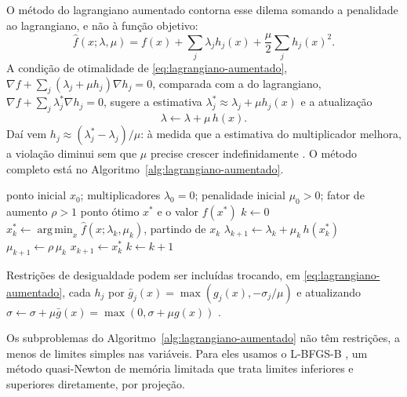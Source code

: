 \documentclass[12pt, oneside, a4paper, english, brazil]{abntex2}
\theoremstyle{relatorio}
\theoremstyle{relatorioit}
\theoremstyle{problema}
\DeclareMathOperator*{\argmin}{arg\,min}
\begin{document}
O método do lagrangiano aumentado \parencite{hestenes1969, powell1969} contorna esse
dilema somando a penalidade ao lagrangiano, e não à função objetivo:
\begin{equation}
  \hat f(x; \lambda, \mu) = f(x) + \sum_j \lambda_j h_j(x) + \frac{\mu}{2} \sum_j h_j(x)^2.
  \label{eq:lagrangiano-aumentado}
\end{equation}
A condição de otimalidade de \eqref{eq:lagrangiano-aumentado},
$\nabla f + \sum_j (\lambda_j + \mu h_j) \nabla h_j = 0$, comparada com a do lagrangiano,
$\nabla f + \sum_j \lambda^*_j \nabla h_j = 0$, sugere a estimativa
$\lambda_j^* \approx \lambda_j + \mu h_j(x)$ e a atualização
\begin{equation}
  \lambda \leftarrow \lambda + \mu\, h(x).
  \label{eq:atualizacao}
\end{equation}
Daí vem $h_j \approx (\lambda_j^* - \lambda_j)/\mu$: à medida que a estimativa do
multiplicador melhora, a violação diminui sem que $\mu$ precise crescer
indefinidamente \parencite{martins2021}. O método completo está no
Algoritmo~\ref{alg:lagrangiano-aumentado}.

\begin{algorithm}[H]
\caption{Método do lagrangiano aumentado \parencite[Alg.~5.2]{martins2021}}
\label{alg:lagrangiano-aumentado}
\begin{algorithmic}[1]
  \Require ponto inicial $x_0$; multiplicadores $\lambda_0 = 0$; penalidade inicial
    $\mu_0 > 0$; fator de aumento $\rho > 1$
  \Ensure ponto ótimo $x^*$ e o valor $f(x^*)$
  \State $k \gets 0$
    \State $x_k^* \gets \argmin_x \hat f(x; \lambda_k, \mu_k)$, partindo de $x_k$
    \State $\lambda_{k+1} \gets \lambda_k + \mu_k\, h(x_k^*)$ 
    \State $\mu_{k+1} \gets \rho\, \mu_k$ 
    \State $x_{k+1} \gets x_k^*$ 
    \State $k \gets k + 1$
  \EndWhile
\end{algorithmic}
\end{algorithm}

Restrições de desigualdade podem ser incluídas trocando, em
\eqref{eq:lagrangiano-aumentado}, cada $h_j$ por
$\bar g_j(x) = \max\left(g_j(x), -\sigma_j/\mu\right)$ e atualizando
$\sigma \gets \sigma + \mu \bar g(x) = \max\left(0, \sigma + \mu g(x)\right)$
\parencite{rockafellar1973, martins2021}.

Os subproblemas do Algoritmo~\ref{alg:lagrangiano-aumentado} não têm restrições, a
menos de limites simples nas variáveis. Para eles usamos o L-BFGS-B
\parencite{byrd1995}, um método quasi-Newton de memória limitada que trata limites
inferiores e superiores diretamente, por projeção.
\end{document}
